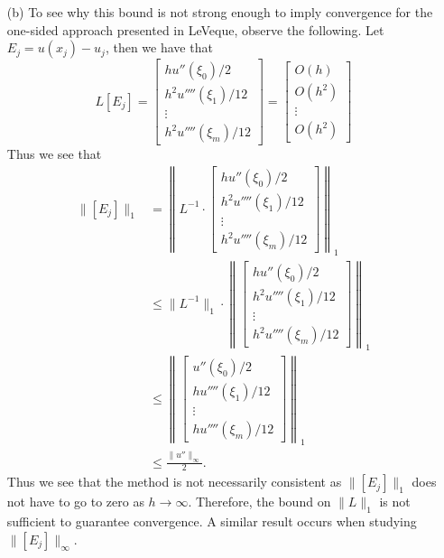 \documentclass[12pt]{report}
\begin{document}
\begin{solution}
\begin{enumerate}
    \item [(b)]
    To see why this bound is not strong enough to imply convergence for the one-sided approach presented in LeVeque, observe the following. Let $E_j = u(x_j) - u_j$, then we have that
    \[
      L[E_j] = \begin{bmatrix}
        h u''(\xi_0)/2\\
        h^2 u''''(\xi_1)/12\\
        \vdots\\
        h^2 u''''(\xi_m)/12
      \end{bmatrix} = \begin{bmatrix}
        O(h)\\
        O(h^2)\\
        \vdots\\
        O(h^2)
      \end{bmatrix}
    \]
    Thus we see that
    \begin{align*}
      \|[E_j]\|_1 &= \left\| L^{-1} \cdot \begin{bmatrix}
        h u''(\xi_0)/2\\
        h^2 u''''(\xi_1)/12\\
        \vdots\\
        h^2 u''''(\xi_m)/12
      \end{bmatrix}\right\|_1\\
      &\leq \| L^{-1}\|_1 \cdot \left\| \begin{bmatrix}
        h u''(\xi_0)/2\\
        h^2 u''''(\xi_1)/12\\
        \vdots\\
        h^2 u''''(\xi_m)/12
      \end{bmatrix}\right\|_1\\
      &\leq \left\| \begin{bmatrix}
        u''(\xi_0)/2\\
        h u''''(\xi_1)/12\\
        \vdots\\
        h u''''(\xi_m)/12
      \end{bmatrix}\right\|_1\\
      &\leq \frac{\|u''\|_\infty}{2}.
    \end{align*} 
    Thus we see that the method is not necessarily consistent as $\|[E_j]\|_1$ does not have to go to zero as $h \to \infty$. Therefore, the bound on $\|L\|_1$ is not sufficient to guarantee convergence. A similar result occurs when studying $\|[E_j]\|_\infty$. 


\end{enumerate}
\end{solution}
\end{document}
